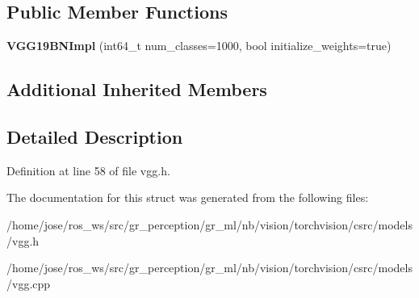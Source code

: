 \subsection*{Public Member Functions}
\begin{DoxyCompactItemize}
\item 
\mbox{\label{structvision_1_1models_1_1VGG19BNImpl_a10cdd25627d58d4c1e62501b7fcf6c98}} 
{\bfseries V\+G\+G19\+B\+N\+Impl} (int64\+\_\+t num\+\_\+classes=1000, bool initialize\+\_\+weights=true)
\end{DoxyCompactItemize}
\subsection*{Additional Inherited Members}


\subsection{Detailed Description}


Definition at line 58 of file vgg.\+h.



The documentation for this struct was generated from the following files\+:\begin{DoxyCompactItemize}
\item 
/home/jose/ros\+\_\+ws/src/gr\+\_\+perception/gr\+\_\+ml/nb/vision/torchvision/csrc/models/vgg.\+h\item 
/home/jose/ros\+\_\+ws/src/gr\+\_\+perception/gr\+\_\+ml/nb/vision/torchvision/csrc/models/vgg.\+cpp\end{DoxyCompactItemize}
